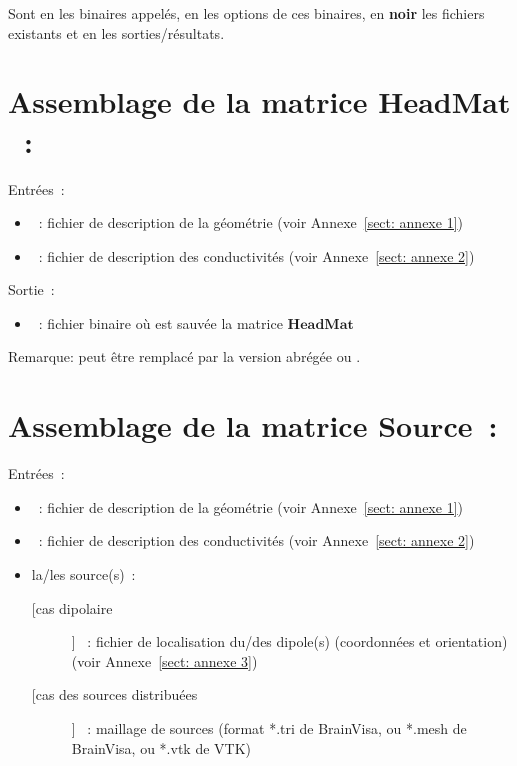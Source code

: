\noindent
Sont en  les binaires appelés, en  les options de ces binaires, en \textbf{noir}
les fichiers existants et en  les sorties/résultats. 

\section{Assemblage de la matrice $\mathbf{HeadMat}$~:}
\label{sect: command assemble HeadMat}

\noindent
Entrées~: 
\begin{itemize}
    \item {}~: fichier de description de la géométrie (voir Annexe~\ref{sect: annexe 1})
    \item {}~: fichier de description des conductivités (voir Annexe~\ref{sect: annexe 2})
\end{itemize}

\noindent
Sortie~:
\begin{itemize}
    \item {}~: fichier binaire où est sauvée la matrice $\mathbf{HeadMat}$
\end{itemize}

\medskip

\noindent
{}
\medskip
Remarque:  peut être remplacé par la version abrégée  ou .

\section{Assemblage de la matrice $\mathbf{Source}$~:}
\label{sect: command assemble SourceMat}

\noindent
Entrées~: 
\begin{itemize}
    \item {}~: fichier de description de la géométrie (voir Annexe~\ref{sect: annexe 1})
    \item {}~: fichier de description des conductivités (voir Annexe~\ref{sect: annexe 2})
    \item la/les source(s)~:
        \begin{description}
            \item [[cas dipolaire]] ~: fichier de localisation du/des dipole(s) (coordonnées et orientation)
                                    (voir Annexe~\ref{sect: annexe 3}) 
            \item [[cas des sources distribuées]]  ~: maillage de sources (format *.tri de BrainVisa, ou *.mesh de BrainVisa, ou *.vtk de VTK) 
        \end{description}
\end{itemize}

